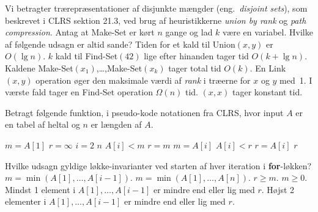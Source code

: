 Vi betragter trærepræsentationer af disjunkte mængder (eng.~\emph{disjoint sets}), som beskrevet i CLRS sektion 21.3, ved brug af heuristikkerne \emph{union by rank} og \emph{path compression}.
Antag at {\sc Make-Set} er kørt $n$ gange og lad $k$ være en variabel.
Hvilke af følgende udsagn er altid sande?
\fleresvar
\mulighederstart
\svar Tiden for et kald til {\sc Union}$(x,y)$ er $O(\lg n)$. \korrekt
\svar $k$ kald til {\sc Find-Set}$(42)$ lige efter hinanden tager tid $O(k + \lg n)$. \korrekt
\svar Kaldene {\sc Make-Set}$(x_1)$,\dots,{\sc Make-Set}$(x_k)$ tager total tid $O(k)$. \korrekt
\svar En {\sc Link}$(x,y)$ operation øger den maksimale værdi af \emph{rank} i træerne for $x$ og $y$ med~1.
\svar I værste fald tager en {\sc Find-Set} operation $\Omega(n)$ tid.
$(x,x)$ tager konstant tid.
\mulighederslut
{}


Betragt følgende funktion, i pseudo-kode notationen fra CLRS, hvor input $A$ er en tabel af heltal og $n$ er længden af $A$.
\begin{codebox}
  \li $m = A[1]$
  \li $r = \infty$
  \li \For $i = 2$ \To $n$
  \li \Do \If $A[i] < m$  
  \li         \Then $r = m$
  \li         $m = A[i]$ 
  \li       \ElseIf $A[i] < r$
  \li     \Then $r = A[i]$  \End \End \End
  \li \Return $r$
\end{codebox}

\noindent
Hvilke udsagn gyldige løkke-invarianter ved starten af hver iteration i {\bf for}-løkken?
\fleresvar
\mulighederstart
\svar $m = \min(A[1],\dots,A[i-1])$. \korrekt
\svar $m = \min(A[1],\dots,A[n])$.
\svar $r \geq m$. \korrekt
\svar $m \geq 0$.
\svar Mindst 1 element i $A[1],\dots,A[i-1]$ er mindre end eller lig med $r$. \korrekt
\svar Højst 2 elementer i $A[1],\dots,A[i-1]$ er mindre end eller lig med $r$.
\mulighederslut




